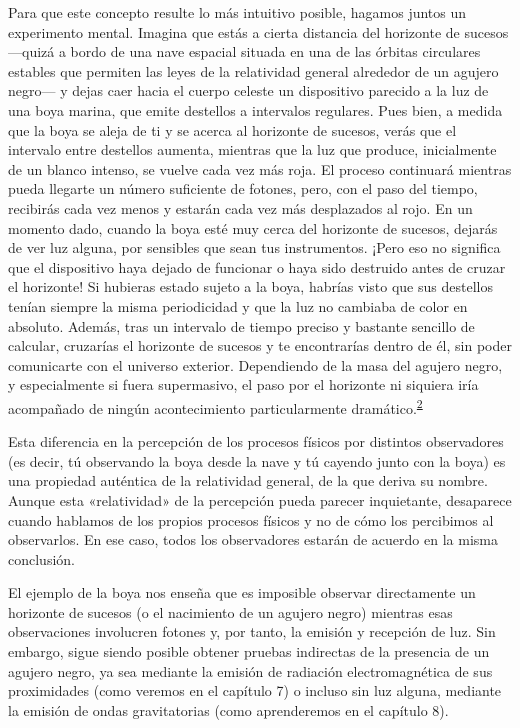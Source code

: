 Para que este concepto resulte lo más intuitivo posible, hagamos juntos un experimento mental. Imagina que estás a cierta distancia del horizonte de sucesos ---quizá a bordo de una nave espacial situada en una de las órbitas circulares estables que permiten las leyes de la relatividad general alrededor de un agujero negro--- y dejas caer hacia el cuerpo celeste un dispositivo parecido a la luz de una boya marina, que emite destellos a intervalos regulares. Pues bien, a medida que la boya se aleja de ti y se acerca al horizonte de sucesos, verás que el intervalo entre destellos aumenta, mientras que la luz que produce, inicialmente de un blanco intenso, se vuelve cada vez más roja. El proceso continuará mientras pueda llegarte un número suficiente de fotones, pero, con el paso del tiempo, recibirás cada vez menos y estarán cada vez más desplazados al rojo. En un momento dado, cuando la boya esté muy cerca del horizonte de sucesos, dejarás de ver luz alguna, por sensibles que sean tus instrumentos. ¡Pero eso no significa que el dispositivo haya dejado de funcionar o haya sido destruido antes de cruzar el horizonte! Si hubieras estado sujeto a la boya, habrías visto que sus destellos tenían siempre la misma periodicidad y que la luz no cambiaba de color en absoluto. Además, tras un intervalo de tiempo preciso y bastante sencillo de calcular, cruzarías el horizonte de sucesos y te encontrarías dentro de él, sin poder comunicarte con el universo exterior. Dependiendo de la masa del agujero negro, y especialmente si fuera supermasivo, el paso por el horizonte ni siquiera iría acompañado de ningún acontecimiento particularmente dramático.\textsuperscript{\hyperlink{note:06-02}{2}}

Esta diferencia en la percepción de los procesos físicos por distintos observadores (es decir, tú observando la boya desde la nave y tú cayendo junto con la boya) es una propiedad auténtica de la relatividad general, de la que deriva su nombre. Aunque esta «relatividad» de la percepción pueda parecer inquietante, desaparece cuando hablamos de los propios procesos físicos y no de cómo los percibimos al observarlos. En ese caso, todos los observadores estarán de acuerdo en la misma conclusión.

El ejemplo de la boya nos enseña que es imposible observar directamente un horizonte de sucesos (o el nacimiento de un agujero negro) mientras esas observaciones involucren fotones y, por tanto, la emisión y recepción de luz. Sin embargo, sigue siendo posible obtener pruebas indirectas de la presencia de un agujero negro, ya sea mediante la emisión de radiación electromagnética de sus proximidades (como veremos en el capítulo 7) o incluso sin luz alguna, mediante la emisión de ondas gravitatorias (como aprenderemos en el capítulo 8).

